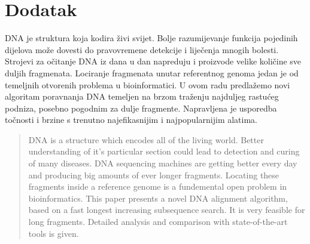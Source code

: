 \documentclass[times, utf8, diplomski]{fer}
\begin{document}
\chapter{Dodatak}




\begin{sazetak}

DNA je struktura koja kodira živi svijet. Bolje razumijevanje funkcija pojedinih dijelova može dovesti do pravovremene detekcije i liječenja mnogih bolesti. Strojevi za očitanje DNA iz dana u dan napreduju i proizvode velike količine sve duljih fragmenata. Lociranje fragmenata unutar referentnog genoma jedan je od temeljnih otvorenih problema u bioinformatici. U ovom radu predlažemo novi algoritam poravnanja DNA temeljen na brzom traženju najduljeg rastućeg podniza, posebno pogodnim za dulje fragmente. Napravljena je usporedba točnosti i brzine s trenutno najefikasnijim i najpopularnijim alatima.

\end{sazetak}

\begin{abstract}
DNA is a structure which encodes all of the living world. Better understanding of it's particular section could lead to detection and curing of many diseases. DNA sequencing machines are getting better every day and producing
big amounts of ever longer fragments. Locating these fragments inside a reference genome is a fundemental open
problem in bioinformatics. This paper presents a novel DNA alignment algorithm, based on a fast longest increasing subsequence search. It is very feasible for long fragments. Detailed analysis and comparison with state-of-the-art tools is given.

\end{abstract}
\end{document}
